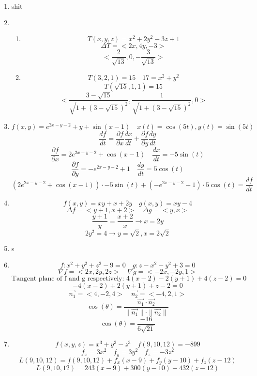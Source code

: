 \documentclass[12pt]{article}
\begin{document}
\maketitle \begin{enumerate}

\item shit

\item \begin{enumerate}
\item 
$$T(x, y, z) = x^2 +2y^2 - 3z + 1$$
$$\Delta T  = <2x, 4y, -3>$$
$$<\frac{2}{\sqrt{13}}, 0, -\frac{3}{\sqrt{13}}>$$
\item $$T(3, 2, 1) = 15 \quad 17 = x^2 + y^2$$
$$T(\sqrt{15},1, 1) = 15$$
$$<\frac{3-\sqrt{15}}{\sqrt{1+(3-\sqrt{15})^2}}, \frac{1}{\sqrt{1+(3-\sqrt{15})^2}}, 0>$$
\end{enumerate}

\item $$f(x, y) = e^{2x-y-2}+y+\sin(x-1) \quad x(t) = \cos (5t), y(t) = \sin (5t)$$
$$\frac{df}{dt} = \frac{\partial f}{\partial x} \frac{dx}{dt} + \frac{\partial f}{\partial y} \frac{dy}{dt}$$
$$\frac{\partial f}{\partial x} = 2e^{2x-y-2}+\cos(x-1) \quad \frac{dx}{dt} = -5\sin(t)$$
$$\frac{\partial f}{\partial y} = -e^{2x-y-2}+1 \quad \frac{dy}{dt} = 5\cos(t)$$
$$\left(2e^{2x-y-2}+\cos(x-1)\right)\cdot-5\sin(t) + \left(-e^{2x-y-2}+1\right)\cdot5\cos(t) = \frac{df}{dt}$$

\item $$f(x, y) = xy + x + 2y \quad g(x, y) = xy - 4$$
$$\Delta f = <y+1,x+2> \quad \Delta g = <y, x>$$
$$\frac{y+1}{y} = \frac{x+2}{x} \rightarrow x=2y$$
$$2y^2=4 \rightarrow y=\sqrt{2}, x = 2\sqrt{2}$$

\item s
\item $$f:x^2+y^2+z^2-9=0 \quad g:z-x^2-y^2+3=0$$
$$\nabla f = <2x,2y,2z> \quad \nabla g = <-2x,-2y,1>$$
$$\textrm{Tangent plane of f and g respectively: } 4(x-2)-2(y+1)+4(z-2)=0$$
$$-4(x-2)+2 (y+1)+z-2=0$$
$$\vec{n_1} = <4,-2,4> \quad \vec{n_2} = <-4, 2,1>$$
$$\cos(\theta) = \frac{\vec{n_1} \cdot \vec{n_2}}{\parallel \vec{n_1} \parallel \cdot \parallel \vec{n_2} \parallel}$$
$$\cos(\theta) = \frac{-16}{6\sqrt{21}}$$
\item $$f\left(x,y,z\right)=x^3+y^3-z^3 \quad f\left(9,10,12\right) = -899$$
$$f_x = 3x^2 \quad f_y = 3y^2 \quad f_z = -3z^2$$
$$L(9,10,12) = f(9,10,12) + f_x(x-9)+f_y(y-10)+f_z(z-12)$$
$$L(9,10,12) = 243(x-9)+300(y-10)-432(z-12)$$


\end{enumerate}
\end{document}
